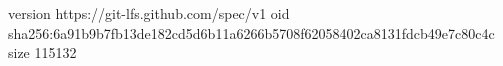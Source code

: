 version https://git-lfs.github.com/spec/v1
oid sha256:6a91b9b7fb13de182cd5d6b11a6266b5708f62058402ca8131fdcb49e7c80c4c
size 115132
